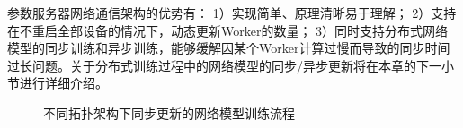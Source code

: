 \documentclass{xdupgthesis}
\begin{document}
参数服务器网络通信架构的优势有：
1）实现简单、原理清晰易于理解；
2）支持在不重启全部设备的情况下，动态更新Worker的数量；
3）同时支持分布式网络模型的同步训练和异步训练，能够缓解因某个Worker计算过慢而导致的同步时间过长问题。关于分布式训练过程中的网络模型的同步/异步更新将在本章的下一小节进行详细介绍。

\begin{figure}[t]
    \centering
    \caption{不同拓扑架构下同步更新的网络模型训练流程}
    \label{fig_DistributedUpdateAlgo}
\end{figure}
\end{document}
